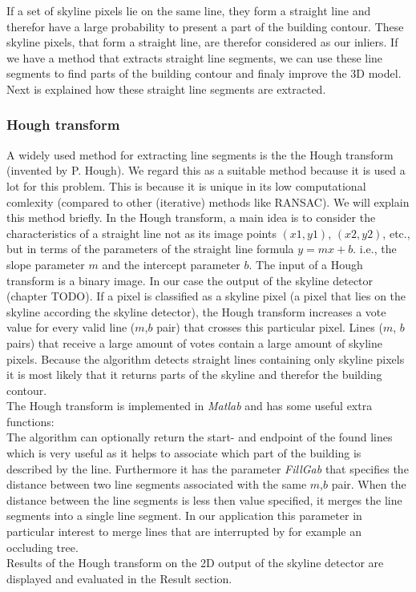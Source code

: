 \documentclass[10pt]{article}
\begin{document}
	If a set of skyline pixels lie on the same line, they form a straight line
	and therefor have a large probability to present a part of the building contour.
	These skyline pixels, that form a straight line, are therefor considered as our
	inliers. 
	If we have a method that extracts straight line segments, we can use these
	line segments to find parts of the building contour and finaly improve the 3D
	model. Next is explained how these straight line segments are extracted.

\subsubsection{Hough transform}
	A widely used method for extracting line segments is the the Hough transform
	(invented by P. Hough).  We regard this as a suitable method because it is
	used a lot for this problem. This is because it is unique in its low
	computational comlexity (compared to other (iterative) methods like RANSAC).
	We will explain this method briefly.
	In the Hough transform, a main idea is to consider the characteristics of a
	straight line not as its image points $(x1, y1)$, $(x2, y2)$, etc., but in
	terms of the parameters of the straight line formula $y = mx + b$. i.e., the
	slope parameter $m$ and the intercept parameter $b$.
	The input of a Hough transform is a binary image. In our case the output of 
	the skyline detector (chapter TODO).
	If a pixel is classified as a skyline pixel (a pixel that lies on the
	skyline according the skyline detector), the Hough transform increases
	a vote value for every valid line ($m$,$b$ pair) that crosses this
	particular pixel.  Lines ($m$, $b$ pairs) that receive a large amount of votes
	contain a large amount of skyline pixels.  
	Because the algorithm detects straight lines containing only skyline pixels it is
	most likely that it returns parts of the skyline and therefor the building contour. \\
	The Hough transform is implemented in \emph{Matlab} and has some useful extra functions:\\
	The algorithm can optionally return the start- and endpoint of the found lines 
	which is very useful as it helps to associate which part of the building is described by the line.
	Furthermore it has the parameter \emph{FillGab} that specifies the distance
	between two line segments associated with the same $m$,$b$ pair. When the
	distance between the line segments is less then value specified, it merges
	the line segments into a single line segment. In our application this
	parameter in particular interest to merge lines that are interrupted by for
	example an occluding tree.\\
	Results of the Hough transform on the 2D output of the skyline detector are
	displayed and evaluated in the Result section.
\end{document}
